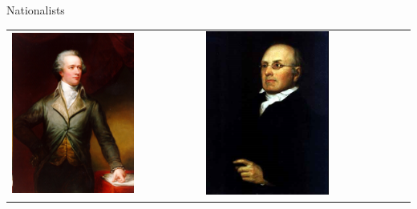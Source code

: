 \begin{frame}{Nationalists}
\begin{table}[h]
\centering
\begin{tabular}{lcccccc} 
    \includegraphics[width=0.75\textwidth,height=.3\textheight,keepaspectratio=true]{img/hamilton-portrait.png} &
    \includegraphics[width=0.75\textwidth,height=.3\textheight,keepaspectratio=true]{img/story-portrait.png} &

\end{tabular}
\end{table}
\end{frame}
